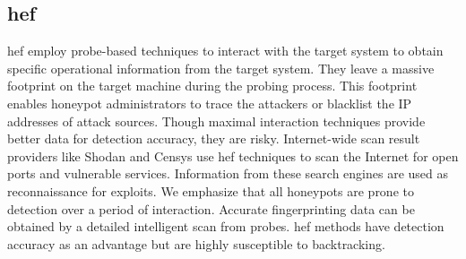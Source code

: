  
 \subsection{\acrfull{hef}}
\acrfull{hef} employ probe-based techniques to interact with the target system to obtain specific operational information from the target system. They leave a massive footprint on the target machine during the probing process. This footprint enables honeypot administrators to trace the attackers or blacklist the IP addresses of attack sources. Though maximal interaction techniques provide better data for detection accuracy, they are risky. Internet-wide scan result providers like Shodan and Censys use \acrshort{hef} techniques to scan the Internet for open ports and vulnerable services. Information from these search engines are used as reconnaissance for exploits. We emphasize that all honeypots are prone to detection over a period of interaction. Accurate fingerprinting data can be obtained by a detailed intelligent scan from probes. \acrshort{hef} methods have detection accuracy as an advantage but are highly susceptible to backtracking. 
